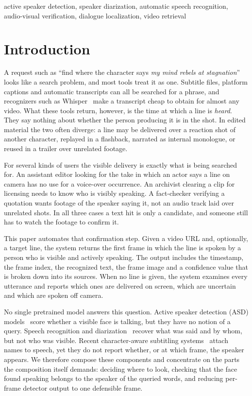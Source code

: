\documentclass[conference]{IEEEtran}
\begin{document}
\begin{IEEEkeywords}
active speaker detection, speaker diarization, automatic speech recognition, audio-visual verification, dialogue localization, video retrieval
\end{IEEEkeywords}

\section{Introduction}
\label{sec:intro}

A request such as ``find where the character says \emph{my mind rebels at stagnation}'' looks like a search problem, and most tools treat it as one. Subtitle files, platform captions and automatic transcripts can all be searched for a phrase, and recognizers such as Whisper~\cite{radford2023whisper} make a transcript cheap to obtain for almost any video. What these tools return, however, is the time at which a line is \emph{heard}. They say nothing about whether the person producing it is in the shot. In edited material the two often diverge: a line may be delivered over a reaction shot of another character, replayed in a flashback, narrated as internal monologue, or reused in a trailer over unrelated footage.

For several kinds of users the visible delivery is exactly what is being searched for. An assistant editor looking for the take in which an actor says a line on camera has no use for a voice-over occurrence. An archivist clearing a clip for licensing needs to know who is visibly speaking. A fact-checker verifying a quotation wants footage of the speaker saying it, not an audio track laid over unrelated shots. In all three cases a text hit is only a candidate, and someone still has to watch the footage to confirm it.

This paper automates that confirmation step. Given a video URL and, optionally, a target line, the system returns the first frame in which the line is spoken by a person who is visible and actively speaking. The output includes the timestamp, the frame index, the recognized text, the frame image and a confidence value that is broken down into its sources. When no line is given, the system examines every utterance and reports which ones are delivered on screen, which are uncertain and which are spoken off camera.

No single pretrained model answers this question. Active speaker detection (ASD) models~\cite{roth2020ava,min2022spell,liao2023lightasd,wang2024loconet} score whether a visible face is talking, but they have no notion of a query. Speech recognition and diarization~\cite{bain2023whisperx,bredin2023pyannote} recover what was said and by whom, but not who was visible. Recent character-aware subtitling systems~\cite{korbar2024llr,huh2024context} attach names to speech, yet they do not report whether, or at which frame, the speaker appears. We therefore compose these components and concentrate on the parts the composition itself demands: deciding where to look, checking that the face found speaking belongs to the speaker of the queried words, and reducing per-frame detector output to one defensible frame.
\end{document}
